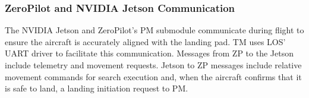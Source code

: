 \subsubsection{ZeroPilot and NVIDIA Jetson Communication}
\label{sec:zp-jetson-communication}

The NVIDIA Jetson and ZeroPilot's PM submodule communicate during flight to
ensure the aircraft is accurately aligned with the landing pad. TM uses LOS'
UART driver to facilitate this communication. Messages from ZP to the Jetson
include telemetry and movement requests. Jetson to ZP messages include relative
movement commands for search execution and, when the aircraft confirms that it
is safe to land, a landing initiation request to PM.

